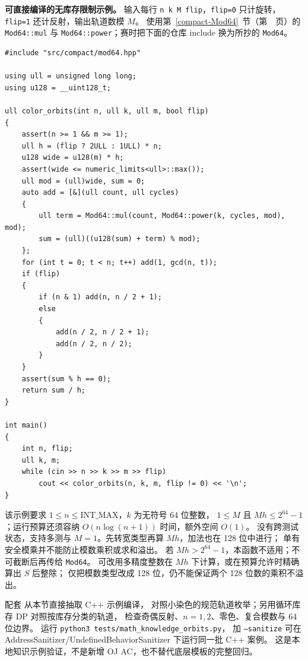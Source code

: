 \Needspace{490pt}
\textbf{可直接编译的无库存限制示例。}
输入每行 \texttt{n k M flip}，\texttt{flip=0} 只计旋转，\texttt{flip=1} 还计反射，输出轨道数模 $M$。
使用第~\ref{compact-Mod64}~节（第~\pageref{compact-Mod64}~页）的
\texttt{Mod64::mul} 与 \texttt{Mod64::power}；赛时把下面的仓库 include 换为所抄的 \texttt{Mod64}。
\begin{lstlisting}
#include "src/compact/mod64.hpp"

using ull = unsigned long long;
using u128 = __uint128_t;

ull color_orbits(int n, ull k, ull m, bool flip)
{
    assert(n >= 1 && m >= 1);
    ull h = (flip ? 2ULL : 1ULL) * n;
    u128 wide = u128(m) * h;
    assert(wide <= numeric_limits<ull>::max());
    ull mod = (ull)wide, sum = 0;
    auto add = [&](ull count, ull cycles)
    {
        ull term = Mod64::mul(count, Mod64::power(k, cycles, mod), mod);
        sum = (ull)((u128(sum) + term) % mod);
    };
    for (int t = 0; t < n; t++) add(1, gcd(n, t));
    if (flip)
    {
        if (n & 1) add(n, n / 2 + 1);
        else
        {
            add(n / 2, n / 2 + 1);
            add(n / 2, n / 2);
        }
    }
    assert(sum % h == 0);
    return sum / h;
}

int main()
{
    int n, flip;
    ull k, m;
    while (cin >> n >> k >> m >> flip)
        cout << color_orbits(n, k, m, flip != 0) << '\n';
}
\end{lstlisting}
该示例要求 $1\le n\le\mathrm{INT\_MAX}$，$k$ 为无符号 64 位整数，
$1\le M$ 且 $Mh\le2^{64}-1$；运行预算还须容纳 $O(n\log(n+1))$ 时间，额外空间 $O(1)$。
没有跨测试状态，支持多测与 $M=1$。先转宽类型再算 $Mh$，加法也在 128 位中进行；
单有安全模乘并不能防止模数乘积或求和溢出。
若 $Mh>2^{64}-1$，本函数不适用；不可截断后再传给 \texttt{Mod64}。
可改用多精度整数在 $Mh$ 下计算，或在预算允许时精确算出 $S$ 后整除；
仅把模数类型改成 128 位，仍不能保证两个 128 位数的乘积不溢出。

配套  从本节直接抽取 C++ 示例编译，
对照小染色的规范轨道枚举；另用循环库存 DP 对照按库存分类的轨道，
检查奇偶反射、$n=1,2$、零色、复合模数与 64 位边界。
运行 \texttt{python3 tests/math\_knowledge\_orbits.py}，
加 \texttt{--sanitize} 可在 AddressSanitizer/UndefinedBehaviorSanitizer 下运行同一批 C++ 案例。
这是本地知识示例验证，不是新增 OJ AC，也不替代底层模板的完整回归。
\label{end-orbits-supplement}
